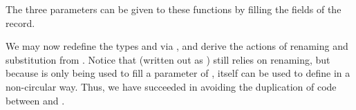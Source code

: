 \trav{}

The three parameters can be given to these functions by filling the fields of
the  record.

\Kit{}

We may now redefine the types  and  via
, and derive the actions of renaming and substitution from
.
Notice that  (written out as
\AgdaSpace{}) still relies on renaming, but
because  is only being used to fill a parameter of
,  itself can be used to define
 in a non-circular way.
Thus, we have succeeded in avoiding the duplication of code between
 and .

\begin{multicols}{3}
  \noindent\RenSub{} \columnbreak

  \noindent\renKit{} \columnbreak

  \noindent\subKit{}
\end{multicols}

